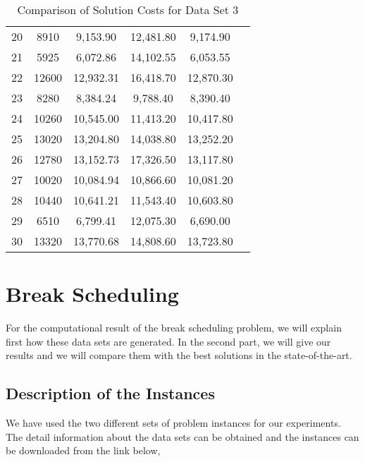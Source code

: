 \begin{table}
\begin{tabular}{cccccc}
20 &   8910	&  9,153.90 & 12,481.80 & 9,174.90 \\

21 & 5925 & 6,072.86 & 14,102.55 & 6,053.55 \\

22 &  12600	& 12,932.31 & 16,418.70 & 12,870.30 \\

23 &  8280 	&  8,384.24 & 9,788.40 &  8,390.40 \\

24 &  10260	& 10,545.00 & 11,413.20 & 10,417.80 \\

25 &  13020	&  13,204.80 & 14,038.80 & 13,252.20 \\

26 &  12780	&  13,152.73 & 17,326.50 & 13,117.80 \\

27 &  10020	&  10,084.94 & 10,866.60 & 10,081.20 \\

28 &   10440	&  10,641.21 & 11,543.40 & 10,603.80 \\

29 &  6510	&  6,799.41 & 12,075.30 & 6,690.00 \\

30 &  13320	& 13,770.68 & 14,808.60 & 13,723.80 \\
\hline
\end{tabular}
\caption{Comparison of Solution Costs for Data Set 3}
\label{tbl:comparedataset3}
\end{table}

\newpage
\newpage




\section{Break Scheduling}


For the computational result of the break scheduling problem, we will explain first how these data sets are generated. In the second part, we will give our results and we will compare them with the best solutions in the state-of-the-art.


\subsection{Description of the Instances}

We have used the two different sets of problem instances for our experiments. The detail information about the data sets can be obtained and the instances can be downloaded from the link below, \\


